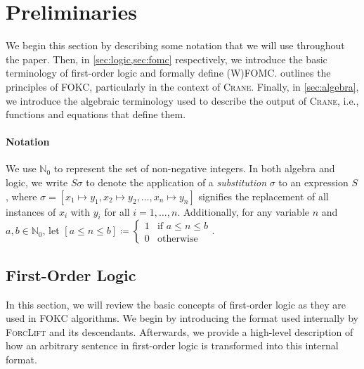 \documentclass[a4paper,UKenglish,cleveref, autoref, thm-restate]{lipics-v2021}
\begin{document}
\section{Preliminaries}\label{sec:preliminaries}

We begin this section by describing some notation that we will use throughout
the paper. Then, in \cref{sec:logic,sec:fomc} respectively, we introduce the
basic terminology of first-order logic and formally define (W)FOMC\@.
 outlines the principles of FOKC, particularly in the context of
\textsc{Crane}. Finally, in \cref{sec:algebra}, we introduce the algebraic
terminology used to describe the output of \textsc{Crane}, i.e., functions and
equations that define them.

\paragraph*{Notation}
We use $\mathbb{N}_{0}$ to represent the set of non-negative integers. In both
algebra and logic, we write $S\sigma$ to denote the application of a
\emph{substitution} $\sigma$ to an expression $S$, where
$\sigma = [x_{1} \mapsto y_{1}, x_{2} \mapsto y_{2}, \dots, x_{n} \mapsto y_{n}]$
signifies the replacement of all instances of $x_{i}$ with $y_{i}$ for all
$i = 1, \dots, n$. Additionally, for any variable $n$ and
$a, b \in \mathbb{N}_{0}$, let $[a \le n \le b] \coloneqq \begin{cases}
  1 & \text{if $a \le n \le b$} \\
  0 & \text{otherwise}
\end{cases}$.

\subsection{First-Order Logic}\label{sec:logic}

In this section, we will review the basic concepts of first-order logic as they
are used in FOKC algorithms. We begin by introducing the format used internally
by \textsc{ForcLift} and its descendants. Afterwards, we provide a high-level
description of how an arbitrary sentence in first-order logic is transformed
into this internal format.
\end{document}
